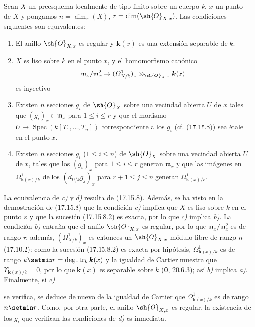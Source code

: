 \begin{corollary}[17.15.9]
\label{IV.17.15.9}
Sean $X$ un preesquema localmente de tipo finito sobre un cuerpo $k$, $x$ un punto de $X$ y pongamos $n=\dim_x(X)$, $r=\dim(\sh{O}_{X,x})$. Las condiciones siguientes son equivalentes:
\begin{enumerate}
  \item[\textup{a)}] El anillo $\sh{O}_{X,x}$ es regular y $\boldsymbol k(x)$ es una extensión separable de $k$.
  \item[\textup{b)}] $X$ es liso sobre $k$ en el punto $x$, y el homomorfismo canónico
  \[
  \mathfrak m_x/\mathfrak m_x^2\to(\varOmega^1_{X/k})_x\otimes_{\sh{O}_{X,x}}\boldsymbol k(x)
  \]
  es inyectivo.
  \item[\textup{c)}] Existen $n$ secciones $g_i$ de $\sh{O}_X$ sobre una vecindad abierta $U$ de $x$ tales que $(g_i)_x\in\mathfrak m_x$ para $1\leq i\leq r$ y que el morfismo $U\to\operatorname{Spec}(k[T_1,\ldots,T_n])$ correspondiente a los $g_i$ \textup{(cf. (17.15.8))} sea étale en el punto $x$.
  \item[\textup{d)}] Existen $n$ secciones $g_i$ \textup{(}$1\leq i\leq n$\textup{)} de $\sh{O}_X$ sobre una vecindad abierta $U$ de $x$, tales que los $(g_i)_x$ para $1\leq i\leq r$ generan $\mathfrak m_x$ y que las imágenes en $\Omega^1_{\mathbf k(x)/k}$ de los $(d_{U/k}g_j)_x$ para $r+1\leq j\leq n$ generan $\Omega^1_{\mathbf k(x)/k}$.
\end{enumerate}
\end{corollary}

La equivalencia de \emph{c)} y \emph{d)} resulta de (17.15.8). Además, se ha visto en la demostración de (17.15.8) que la condición \emph{c)} implica que $X$ es liso sobre $k$ en el punto $x$ y que la sucesión (17.15.8.2) es exacta, por lo que \emph{c)} implica \emph{b)}. La condición \emph{b)} entraña que el anillo $\sh{O}_{X,x}$ es regular, por lo que $\mathfrak m_x/\mathfrak m_x^2$ es de rango $r$; además, $(\varOmega^1_{X/k})_x$ es entonces un $\sh{O}_{X,x}$-módulo libre de rango $n$ (17.10.2); como la sucesión (17.15.8.2) es exacta por hipótesis, $\Omega^1_{\mathbf k(x)/k}$ es de rango $n\setmin r=\deg.\operatorname{tr}_k \boldsymbol k(x)$ y la igualdad de Cartier muestra que $\Upsilon_{\mathbf k(x)/k}=0$, por lo que $\boldsymbol k(x)$ es separable sobre $k$ (\textbf 0, 20.6.3); así \emph{b)} implica \emph{a)}. Finalmente, si \emph{a)}


se verifica, se deduce de nuevo de la igualdad de Cartier que $\Omega^1_{\mathbf k(x)/k}$ es de rango $n\setmin r$. Como, por otra parte, el anillo $\sh{O}_{X,x}$ es regular, la existencia de los $g_i$ que verifican las condiciones de \emph{d)} es inmediata.

